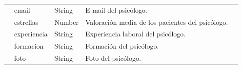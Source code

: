 \begin{table}[htpb]
\begin{tabularx}{\textwidth}{|l|X|X|X|X|}
                   & email                                                                                                                                                  & String                                                                                                                     & E-mail del psicólogo.                                                                                                                                                                                                                                                       \\ \cline{2-4} 
                   & estrellas                                                                                                                                              & Number                                                                                                                     & Valoración media de los pacientes del psicólogo.                                                                                                                                                                                                                            \\ \cline{2-4} 
                   & experiencia                                                                                                                                            & String                                                                                                                     & Experiencia laboral del psicólogo.                                                                                                                                                                                                                                          \\ \cline{2-4} 
                   & formacion                                                                                                                                              & String                                                                                                                     & Formación del psicólogo.                                                                                                                                                                                                                                                    \\ \cline{2-4} 
                   & foto                                                                                                                                                   & String                                                                                                                     & Foto del psicólogo.                                                                                                                                                                                                                                                         \\ \cline{2-4} 

\end{tabularx}
\end{table}
